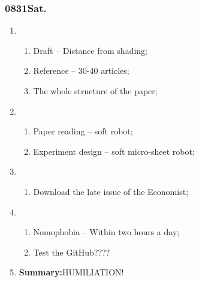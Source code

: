 \subsubsection{0831Sat.}
\begin{enumerate}
	\item \ncquaone
	\begin{enumerate}[(1)]
		\item Draft -- Distance from shading;\rightundoneBlack
		\item Reference -- 30-40 articles;\rightundoneBlack
		\item The whole structure of the paper;\rightundoneBlack
	\end{enumerate}
	
	\item \ncquatwo	
	\begin{enumerate}[(1)]
		\item Paper reading -- soft robot;\rightundoneBlack
		\item Experiment design -- soft micro-sheet robot;\rightundoneBlack
	\end{enumerate}
	
	\item \ncquathree
	\begin{enumerate}[(1)]
		\item Download the late issue of the Economist;\rightundoneBlack
	\end{enumerate}
	
	\item \ncquafour	
	\begin{enumerate}[(1)]
		\item Nomophobia -- Within two hours a day;\rightundoneBlack
		\item Test the GitHub????
	\end{enumerate}
	\item \textbf{Summary:}HUMILIATION! 
\end{enumerate}
